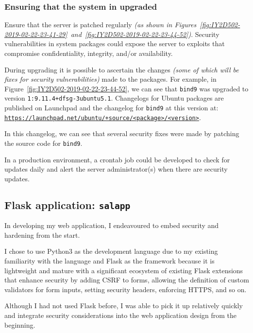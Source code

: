 \pagebreak
\subsubsection{Ensuring that the system in upgraded}
Ensure that the server is patched regularly \textit{(as shown in Figures~\ref{fig:IY2D502-2019-02-22-23-41-29}~and~\ref{fig:IY2D502-2019-02-22-23-44-52})}. Security vulnerabilities in system packages could expose the server to exploits that compromise confidentiality, integrity, and/or availability.

During upgrading it is possible to ascertain the changes \textit{(some of which will be fixes for security vulnerabilities)} made to the packages. For example, in Figure~\ref{fig:IY2D502-2019-02-22-23-44-52}, we can see that \texttt{bind9} was upgraded to version \texttt{1:9.11.4+dfsg-3ubuntu5.1}. Changelogs for Ubuntu packages are published on Launchpad and the changelog for \texttt{bind9} at this version at:\\
\href{https://launchpad.net/ubuntu/+source/bind9/1:9.11.4+dfsg-3ubuntu5.1}{\texttt{https://launchpad.net/ubuntu/+source/<package>/<version>}}.

In this changelog, we can see that several security fixes were made by patching the source code for \texttt{bind9}.

In a production environment, a crontab job could be developed to check for updates daily and alert the server administrator(s) when there are security updates.

\pagebreak
\subsection{Flask application: \texttt{salapp}}
In developing my web application, I endeavoured to embed security and hardening from the start.

I chose to use Python3 as the development language due to my existing familiarity with the language and Flask as the framework because it is lightweight and mature with a significant ecosystem of existing Flask extensions that enhance security by adding CSRF to forms, allowing the definition of custom validators for form inputs, setting security headers, enforcing HTTPS, and so on.

Although I had not used Flask before, I was able to pick it up relatively quickly and integrate security considerations into the web application design from the beginning.

